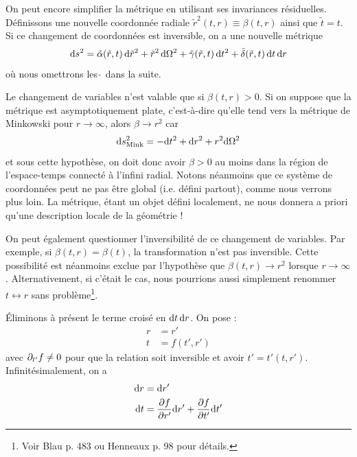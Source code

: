 On peut encore simplifier la métrique en utilisant ses invariances résiduelles. Définissons une nouvelle coordonnée radiale $\tilde{r}^2(t,r) \equiv \beta (t,r)$ ainsi que $\tilde{t} = t$. Si ce changement de coordonnées est inversible, on a une nouvelle métrique 
\begin{equation}
    \mathrm{d} s^2 = \tilde{\alpha} (\tilde{r},t)\, \mathrm{d} \tilde{r}^2 + \tilde{r}^2\, \mathrm{d} \Omega^2 + \tilde{\gamma}(\tilde{r},t) \,\mathrm{d} t^2 + \tilde{\delta} (\tilde{r},t) \, \mathrm{d} t \,\mathrm{d} r
\end{equation}
où nous omettrons les  $\tilde \,$  dans la suite. 
\begin{rmk}
    Le changement de variables n'est valable que si $\beta (t,r)>0$. Si on suppose que la métrique est asymptotiquement plate, c'est-à-dire qu'elle tend vers la métrique de Minkowski pour $r \to \infty$, alors $\beta \to r^2$ car
    \begin{equation}
        \mathrm{d} s_\text{Mink}^2 = -\mathrm{d} t^2 +\mathrm{d} r ^2 + r^2 \mathrm{d} \Omega^2
    \end{equation}
    et sous cette hypothèse, on doit donc avoir $\beta > 0 $ au moins dans la région de l'espace-temps connecté à l'infini radial. Notons néanmoins que ce système de coordonnées peut ne pas être global (i.e. défini partout), comme nous verrons plus loin. La métrique, étant un objet défini localement, ne nous donnera a priori qu'une description locale de la géométrie !
\end{rmk}
\begin{rmk}
    On peut également questionner l'inversibilité de ce changement de variables. Par exemple, si $\beta (t,r) = \beta (t)$, la transformation n'est pas inversible. Cette possibilité est néanmoins exclue par l'hypothèse que $\beta (t,r) \to r^2$ lorsque $r\to \infty$. Alternativement, si c'était le cas, nous pourrions aussi simplement renommer $t \longleftrightarrow r$ sans problème\footnote{Voir Blau p. 483 ou Henneaux p. 98 pour détails.}.
\end{rmk}
Éliminons à présent le terme croisé en $\mathrm{d} t \, \mathrm{d} r$. On pose :
\begin{align*}
    r &= r'\\
    t &= f(t',r')
\end{align*}
avec $\partial_{t'}f \neq 0$ pour que la relation soit inversible et avoir $t' = t'(t,r')$. Infinitésimalement, on a
\begin{align*}
    \mathrm{d} r &= \mathrm{d} r' \\
    \mathrm{d} t &= \frac{\partial f}{\partial r'} \mathrm{d} r' + \frac{\partial f}{ \partial t'} \mathrm{d} t'
\end{align*}
